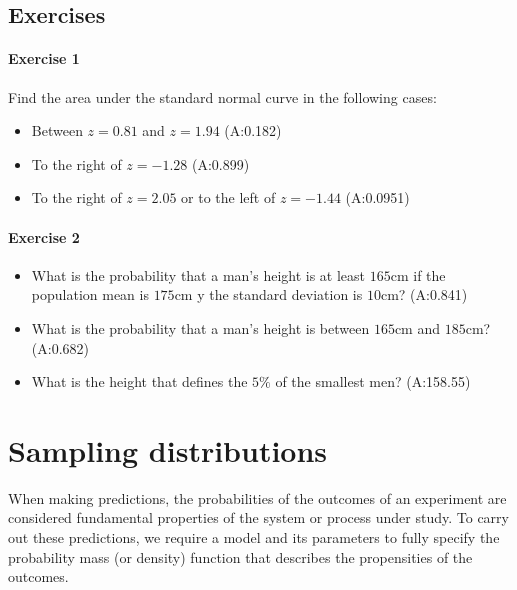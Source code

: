 \documentclass[
]{book}
\providecommand{\tightlist}{%
  \setlength{\itemsep}{0pt}\setlength{\parskip}{0pt}}
\begin{document}
\hypertarget{exercises-7}{%
\section{Exercises}\label{exercises-7}}

\hypertarget{exercise-1-6}{%
\subsubsection{Exercise 1}\label{exercise-1-6}}

Find the area under the standard normal curve in the following cases:

\begin{itemize}
\tightlist
\item
  Between \(z=0.81\) and \(z=1.94\) (A:0.182)
\item
  To the right of \(z=-1.28\) (A:0.899)
\item
  To the right of \(z=2.05\) or to the left of \(z=-1.44\) (A:0.0951)
\end{itemize}

\hypertarget{exercise-2-6}{%
\subsubsection{Exercise 2}\label{exercise-2-6}}

\begin{itemize}
\item
  What is the probability that a man's height is at least
  \(165\)cm if the population mean is \(175\)cm y the standard deviation is \(10\)cm? (A:0.841)
\item
  What is the probability that a man's height is between
  \(165\)cm and \(185\)cm? (A:0.682)
\item
  What is the height that defines the \(5\%\) of the smallest men? (A:158.55)
\end{itemize}

\hypertarget{sampling-distributions}{%
\chapter{Sampling distributions}\label{sampling-distributions}}

When making predictions, the probabilities of the outcomes of an experiment are considered fundamental properties of the system or process under study. To carry out these predictions, we require a model and its parameters to fully specify the probability mass (or density) function that describes the propensities of the outcomes.
\end{document}
